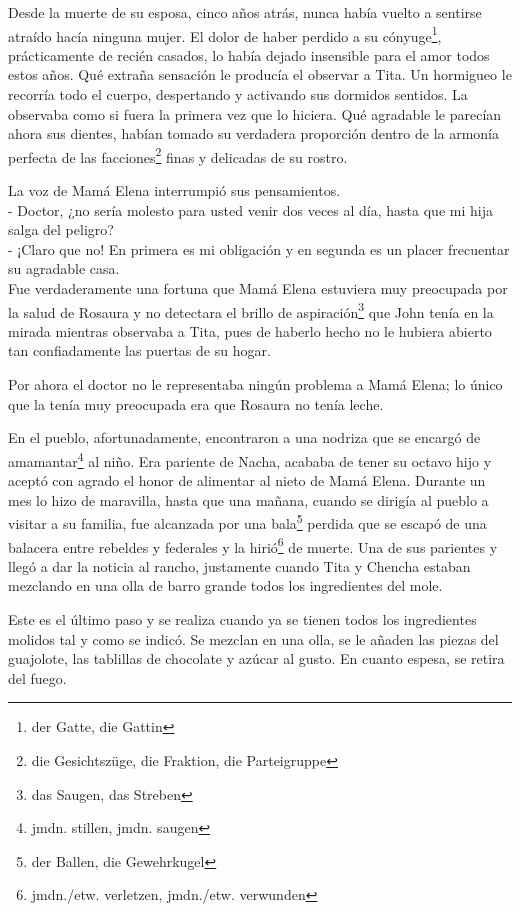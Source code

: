 Desde la muerte de su esposa, cinco años atrás, nunca había vuelto a
sentirse atraído hacía ninguna mujer. El dolor de haber perdido a su cónyuge\footnote{der Gatte, die Gattin}, prácticamente
de recién casados, lo había dejado insensible para el amor todos estos años.
Qué extraña sensación le producía el observar a Tita. Un hormigueo le recorría
todo el cuerpo, despertando y activando sus dormidos sentidos. La observaba
como si fuera la primera vez que lo hiciera. Qué agradable le parecían ahora
sus dientes, habían tomado su verdadera proporción dentro de la armonía perfecta
de las facciones\footnote{die Gesichtszüge, die Fraktion, die Parteigruppe}
finas y delicadas de su rostro.

La voz de Mamá Elena interrumpió sus pensamientos.
\\- Doctor, ¿no sería molesto para usted venir dos veces al día, hasta que %
mi hija salga del peligro? %
\\- ¡Claro que no! En primera es mi obligación y en segunda es un placer %
frecuentar su agradable casa.\\

Fue verdaderamente una fortuna que Mamá Elena estuviera muy preocupada
por la salud de Rosaura y no detectara el brillo de aspiración\footnote{das Saugen, das Streben} que John
tenía en la mirada mientras observaba a Tita, pues de haberlo hecho no
le hubiera abierto tan confiadamente las puertas de su hogar.

Por ahora el doctor no le representaba ningún problema a Mamá Elena; lo
único que la tenía muy preocupada era que Rosaura no tenía leche.

En el pueblo, afortunadamente, encontraron a una nodriza que se encargó
de amamantar\footnote{jmdn. stillen, jmdn. saugen} al
niño. Era pariente de Nacha, acababa de tener su octavo
hijo y aceptó con agrado el honor de alimentar al nieto de Mamá Elena.
Durante un mes lo hizo de maravilla, hasta que una mañana, cuando se
dirigía al pueblo a visitar a su familia, fue alcanzada por una bala\footnote{der Ballen, die Gewehrkugel} perdida que se escapó
de una balacera entre rebeldes y federales y la hirió\footnote{jmdn./etw. verletzen, jmdn./etw. verwunden}
de muerte. Una de sus parientes y llegó a dar la noticia al
rancho, justamente cuando Tita y Chencha estaban mezclando en una olla
de barro grande todos los ingredientes del mole.

Este es el último paso y se realiza cuando ya se tienen todos los
ingredientes molidos tal y como se indicó. Se mezclan en una olla, se le
añaden las piezas del guajolote, las tablillas de chocolate y azúcar al
gusto. En cuanto espesa, se retira del fuego.

